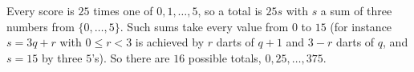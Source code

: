 Every score is $25$ times one of $0,1,\dots,5$, so a total is $25s$ with $s$ a sum of three numbers from $\{0,\dots,5\}$. Such sums take every value from $0$ to $15$ (for instance $s=3q+r$ with $0\le r<3$ is achieved by $r$ darts of $q+1$ and $3-r$ darts of $q$, and $s=15$ by three $5$'s). So there are $\boxed{16}$ possible totals, $0,25,\dots,375$.
